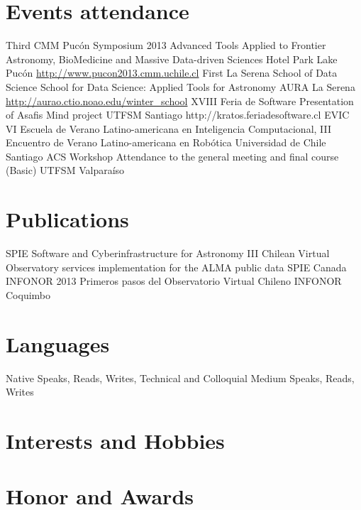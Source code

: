 \documentclass[11pt,a4paper]{moderncv}
\begin{document}
\section{Events attendance}
	{Third CMM Pucón Symposium 2013}
	{Advanced Tools Applied to Frontier Astronomy, BioMedicine and Massive Data-driven Sciences}
	{Hotel Park Lake}
	{Pucón}
	{\url{http://www.pucon2013.cmm.uchile.cl}}
	{First La Serena School of Data Science}
	{School for Data Science: Applied Tools for Astronomy}
	{AURA}
	{La Serena}
	{\url{http://aurao.ctio.noao.edu/winter_school}}
	{XVIII Feria de Software}
	{Presentation of Asafis Mind project}
	{UTFSM}
	{Santiago}
	{http://kratos.feriadesoftware.cl}
	{EVIC}
	{VI Escuela de Verano Latino-americana en Inteligencia Computacional, III Encuentro de Verano Latino-americana en Robótica}
	{Universidad de Chile}
	{Santiago}
	{}
	{ACS Workshop}
	{Attendance to the general meeting and final course (Basic)}
	{UTFSM}
	{Valparaíso}
	{}

\section{Publications}
	{SPIE Software and Cyberinfrastructure for Astronomy III}
	{Chilean Virtual Observatory services implementation for the ALMA public data}
	{SPIE}
	{Canada}
	{}
	{INFONOR 2013}
	{Primeros pasos del Observatorio Virtual Chileno}
	{INFONOR}
	{Coquimbo}
	{}

\section{Languages}
	{Native}
	{Speaks, Reads, Writes, Technical and Colloquial}
	{Medium}
	{Speaks, Reads, Writes}

\newpage
\section{Interests and Hobbies}

\section{Honor and Awards}
\end{document}
